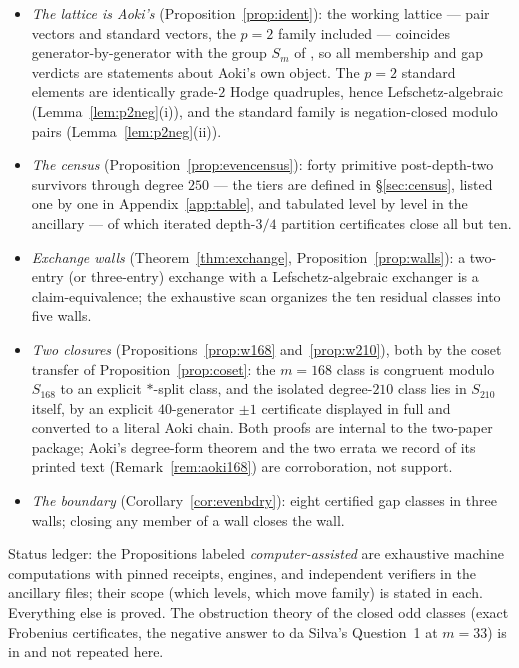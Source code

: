 \documentclass[11pt]{amsart}
\theoremstyle{remark}
\begin{document}
\begin{itemize}
\item[--] \emph{The lattice is Aoki's} (Proposition~\ref{prop:ident}): the working lattice ---
pair vectors and standard vectors, the $p=2$ family included --- coincides
generator-by-generator with the group $S_m$ of \cite[\S2]{Aoki00}, so all membership and gap
verdicts are statements about Aoki's own object. The $p=2$ standard elements are identically
grade-$2$ Hodge quadruples, hence Lefschetz-algebraic (Lemma~\ref{lem:p2neg}(i)), and the
standard family is negation-closed modulo pairs (Lemma~\ref{lem:p2neg}(ii)).
\item[--] \emph{The census} (Proposition~\ref{prop:evencensus}): forty primitive
post-depth-two survivors through degree $250$ --- the tiers are defined in \S\ref{sec:census},
listed one by one in Appendix~\ref{app:table}, and tabulated level by level in the ancillary ---
of which iterated depth-$3/4$ partition certificates close all but ten.
\item[--] \emph{Exchange walls} (Theorem~\ref{thm:exchange}, Proposition~\ref{prop:walls}): a
two-entry (or three-entry) exchange with a Lefschetz-algebraic exchanger is a claim-equivalence;
the exhaustive scan organizes the ten residual classes into five walls.
\item[--] \emph{Two closures} (Propositions~\ref{prop:w168} and~\ref{prop:w210}), both by the
coset transfer of Proposition~\ref{prop:coset}: the $m=168$ class is congruent modulo $S_{168}$
to an explicit $*$-split class, and the isolated degree-$210$ class lies in $S_{210}$ itself, by
an explicit $40$-generator $\pm1$ certificate displayed in full and converted to a literal Aoki
chain. Both proofs are internal to the two-paper package; Aoki's degree-form theorem and the two errata we record of its
printed text (Remark~\ref{rem:aoki168}) are corroboration, not support.
\item[--] \emph{The boundary} (Corollary~\ref{cor:evenbdry}): eight certified gap classes in
three walls; closing any member of a wall closes the wall.
\end{itemize}

Status ledger: the Propositions labeled \emph{computer-assisted} are exhaustive machine
computations with pinned receipts, engines, and independent verifiers in the ancillary files;
their scope (which levels, which move family) is stated in each. Everything else is proved.
The obstruction theory of the closed odd classes (exact Frobenius certificates, the negative
answer to da Silva's Question~1 at $m=33$) is in \cite{BN} and not repeated here.
\end{document}
